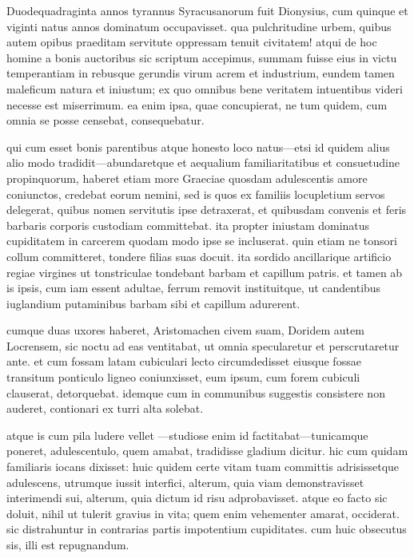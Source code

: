  Duodequadraginta annos tyrannus Syracusanorum fuit Dionysius, cum quinque et viginti natus annos dominatum occupavisset. qua pulchritudine urbem, quibus autem opibus praeditam servitute oppressam tenuit civitatem! atqui de hoc homine a bonis auctoribus sic scriptum accepimus, summam fuisse eius in victu temperantiam in rebusque gerundis virum acrem et industrium, eundem tamen maleficum natura et iniustum; ex quo omnibus bene veritatem intuentibus videri necesse est miserrimum. ea enim ipsa, quae concupierat, ne tum quidem, cum omnia se posse censebat, consequebatur.

 qui cum esset bonis parentibus atque honesto loco natus—etsi id quidem alius alio modo tradidit—abundaretque et aequalium familiaritatibus et consuetudine propinquorum, haberet etiam more Graeciae quosdam adulescentis amore coniunctos, credebat eorum nemini, sed is quos ex familiis locupletium servos delegerat, quibus nomen servitutis ipse detraxerat, et quibusdam convenis et feris barbaris corporis custodiam committebat. ita propter iniustam dominatus cupiditatem in carcerem quodam modo ipse se incluserat. quin etiam ne tonsori collum committeret, tondere filias suas docuit. ita sordido ancillarique artificio regiae virgines ut tonstriculae tondebant barbam et capillum patris. et tamen ab is ipsis, cum iam essent adultae, ferrum removit instituitque, ut candentibus iuglandium putaminibus barbam sibi et capillum adurerent.

 cumque duas uxores haberet, Aristomachen civem suam, Doridem autem Locrensem, sic noctu ad eas ventitabat, ut omnia specularetur et perscrutaretur ante. et cum fossam latam cubiculari lecto circumdedisset eiusque fossae transitum ponticulo ligneo coniunxisset, eum ipsum, cum forem cubiculi clauserat, detorquebat. idemque cum in communibus suggestis consistere non auderet, contionari ex turri alta solebat.

 atque is cum pila ludere vellet —studiose enim id factitabat—tunicamque poneret, adulescentulo, quem amabat, tradidisse gladium dicitur. hic cum quidam familiaris iocans dixisset: huic quidem certe vitam tuam committis adrisissetque adulescens, utrumque iussit interfici, alterum, quia viam demonstravisset interimendi sui, alterum, quia dictum id risu adprobavisset. atque eo facto sic doluit, nihil ut tulerit gravius in vita; quem enim vehementer amarat, occiderat. sic distrahuntur in contrarias partis impotentium cupiditates. cum huic obsecutus sis, illi est repugnandum.

